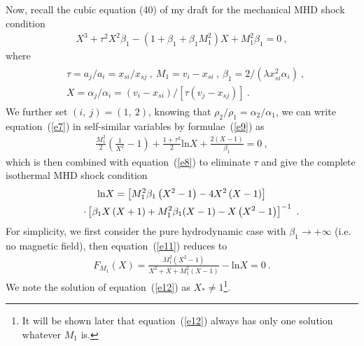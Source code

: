 \documentclass[fleqn,usenatbib]{mnras}
\begin{document}
Now, recall the cubic equation (40) of my draft for the mechanical MHD shock condition
\begin{gather}
X^{3}+\tau^{2}X^{2}\beta_{1}-\left(1+\beta_{1}+\beta_{1}M_{1}^{2}\right)X+M_{1}^{2}\beta_{1}=0\ ,\label{e8}
\end{gather}
where 
\begin{gather}
\begin{split}
&\tau=a_{j}/a_{i}=x_{si}/x_{sj}\ ,
\ M_{1}=v_{i}-x_{si}\ ,
\ \beta_{1}=2/(\lambda x^{2}_{si}\alpha_{i})\ ,\\
&X=\alpha_{j}/\alpha_{i}=(v_{i}-x_{si})/[\tau (v_{j}-x_{sj})]\ .
\end{split}\label{e9}
\end{gather}
We further set $(i,\ j)=(1,\ 2)$, knowing that $\rho_{2}/\rho_{1}=\alpha_{2}/\alpha_{1}$, we can write equation~(\ref{e7}) in self-similar variables by formulae~(\ref{e9}) as
\begin{gather}
\frac{M_{1}^{2}}{2}\left(\frac{1}{X^{2}}-1\right)+\frac{1+\tau^{2}}{2}\mathrm{ln}X+\frac{2(X-1)}{\beta_{1}}=0\label{e10}\ ,
\end{gather}
which is then combined with equation~(\ref{e8}) to eliminate $\tau$ and give the complete isothermal MHD shock condition
\begin{gather}
\mathrm{ln}X=\left[M_{1}^{2}\beta_{1}\left(X^{2}-1\right)-4X^{2}\left(X-1\right)\right]\notag\\
\qquad\cdot \left[\beta_{1}X\left(X+1\right)+M_{1}^{2}\beta_{1}(X-1)-X\left(X^{2}-1\right)\right]^{-1}\label{e11}\ .
\end{gather}
For simplicity, we first consider the pure hydrodynamic case with $\beta_{1}\rightarrow+\infty$ (i.e. no magnetic field), then equation~(\ref{e11}) reduces to
\begin{gather}
F_{M_{1}}(X)=\frac{M_{1}^{2}\left(X^{2}-1\right)}{X^{2}+X+M_{1}^{2}(X-1)}-\mathrm{ln}X=0\label{e12}\ .
\end{gather}
We note the solution of equation~(\ref{e12}) as $X_{*}\neq 1$\footnote{It will be shown later that equation~(\ref{e12}) always has only one solution whatever $M_{1}$ is.}.
\end{document}
